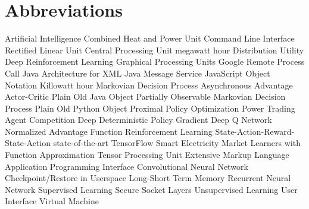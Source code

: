 \newpage
\section*{Abbreviations}
\begin        {acronym}[PowerTAC]
	       {Artificial Intelligence}
	      {Combined Heat and Power Unit}
	      {Command Line Interface}
         {Rectified Linear Unit}
	      {Central Processing Unit}
          {megawatt hour}
	       {Distribution Utility}
	   {Deep Reinforcement Learning}
	      {Graphical Processing Units}
	     {Google Remote Process Call}
	     {Java Architecture for XML}
	      {Java Message Service}
	     {JavaScript Object Notation}
          {Killowatt hour}
	      {Markovian Decision Process}
          {Asynchronous Advantage Actor-Critic}
	     {Plain Old Java Object}
	    {Partially Observable Markovian Decision Process}
	     {Plain Old Python Object}
	      {Proximal Policy Optimization}
	 {Power Trading Agent Competition}
         {Deep Deterministic Policy Gradient}
          {Deep Q Network}
          {Normalized Advantage Function}
	       {Reinforcement Learning}
	    {State-Action-Reward-State-Action}
	     {state-of-the-art}
	       {TensorFlow}
         {Smart Electricity Market Learners with Function Approximation}
	      {Tensor Processing Unit}
	      {Extensive Markup Language}
          {Application Programming Interface}
          {Convolutional Neural Network}
         {Checkpoint/Restore in Userspace}
         {Long-Short Term Memory}
          {Recurrent Neural Network}
           {Supervised Learning}
           {Secure Socket Layers}
           {Unsupervised Learning}
           {User Interface}
           {Virtual Machine}

\end          {acronym}
